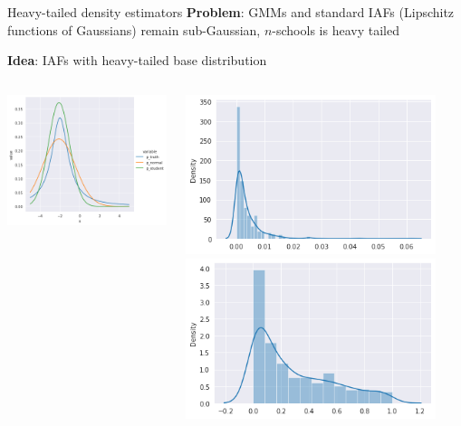 \documentclass[12pt]{beamer}
\begin{document}
\begin{frame}{Heavy-tailed density estimators}
    \textbf{Problem}: GMMs and standard IAFs (Lipschitz functions of Gaussians) remain sub-Gaussian,
    $n$-schools is heavy tailed

    \textbf{Idea}: IAFs with heavy-tailed base distribution
    \begin{columns}
        \begin{column}{0.4\textwidth}
            \includegraphics[width=\textwidth]{figures/heavy_tailed_iaf.png}
        \end{column}
        \begin{column}{0.3\textwidth}
            \includegraphics[width=0.9\textwidth]{figures/heavy_tailed_iaf_normal_ks.png}
            \includegraphics[width=0.9\textwidth]{figures/heavy_tailed_iaf_studentt_ks.png}

\end{column}
\end{columns}
\end{frame}
\end{document}
